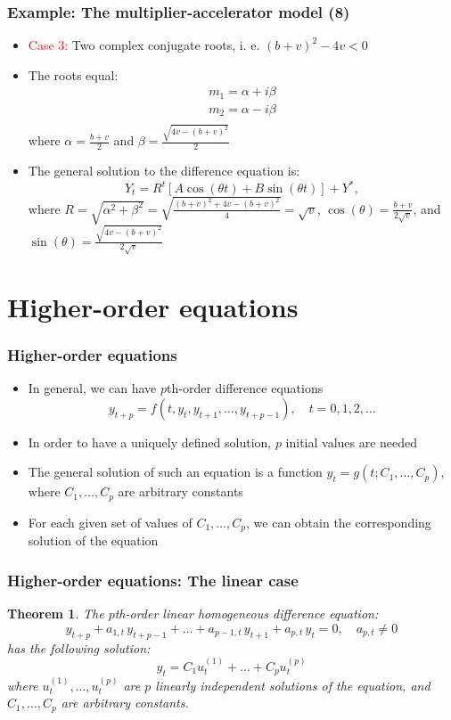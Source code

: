 \documentclass[10pt,usenames,dvipsnames]{beamer}
\theoremstyle{plain}
\newtheorem{thm}{Theorem}
\theoremstyle{definition}
\begin{document}
\begin{frame}[fragile]
\frametitle{Example: The multiplier-accelerator model (8)}
\begin{itemize}
	\item \textcolor{red}{Case 3:} Two complex conjugate roots, i. e. $(b+v)^{2} - 4v < 0$
	\item The roots equal:
	\[
		\begin{array}{lcl}
			m_{1} = \alpha + i\beta\\
			m_{2} = \alpha - i\beta\\
		\end{array}
	\]
	where $\displaystyle \alpha = \frac{b+v}{2}$ and $\displaystyle \beta = \frac{\sqrt{4v - (b + v)^{2}}}{2}$
	\item The general  solution to the difference equation is:
	\[
		Y_{t} = R^{t}[A\cos(\theta t) + B\sin(\theta t)] + Y^{*},
	\]
	where $\displaystyle R = \sqrt{\alpha^{2} + \beta^{2}} = \sqrt{\frac{(b + v)^{2} + 4v - (b + v)^{2}}{4}} = \sqrt{v}$, $\displaystyle \cos(\theta) = \frac{b + v}{2\sqrt{v}}$, and $\displaystyle \sin(\theta) = \frac{\sqrt{4v - (b + v)^{2}}}{2\sqrt{v}}$
\end{itemize}
\end{frame}

\section{Higher-order equations}
\begin{frame}[fragile]
\frametitle{Higher-order equations}
\begin{itemize}
	\item In general, we can have $p$th-order difference equations
	\[
		y_{t+p} = f(t, y_{t}, y_{t+1}, \ldots, y_{t+p-1}), \quad t = 0, 1, 2, \ldots
	\]
	\item In order to have a uniquely defined solution, $p$ initial values are needed
	\item The general solution of such an equation is a function $y_{t} = g(t;C_{1},\ldots, C_{p})$, where $C_{1}, \ldots, C_{p}$ are arbitrary constants
	\item For each given set of values of $C_{1}, \ldots, C_{p}$, we can obtain the corresponding solution of the equation
\end{itemize}
\end{frame}

\begin{frame}[fragile]
\frametitle{Higher-order equations: The linear case}
\begin{thm}
	The  $p$th-order linear homogeneous difference equation:
	\[
			y_{t+p} + a_{1,t} \, y_{t+p-1} + \ldots + a_{p-1,t} \, y_{t+1} + a_{p,t} \, y_{t} = 0, \quad a_{p,t} \neq 0
	\]
	has the following solution:
	\[
		y_{t} = C_{1}u_{t}^{(1)} + \ldots + C_{p}u_{t}^{(p)}
	\]
	where $u_{t}^{(1)}, \ldots, u_{t}^{(p)}$ are $p$ linearly independent solutions of the equation, and $C_{1}, \ldots, C_{p}$ are arbitrary constants.
\end{thm}
\end{frame}
\end{document}
